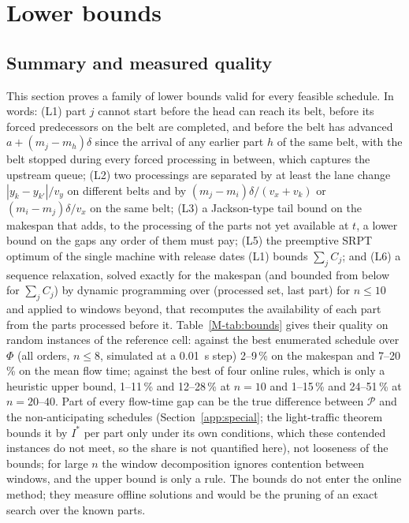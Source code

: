 \documentclass[11pt,a4paper]{article}
\theoremstyle{plain}
\theoremstyle{definition}
\theoremstyle{remark}
\newcommand{\Pb}{\mathcal{P}}
\begin{document}
\section{Lower bounds}\label{app:bounds}
\subsection{Summary and measured quality}
This section proves a family of lower bounds valid for every feasible
schedule. In words: (L1) part $j$ cannot start before the head can reach its belt, before
its forced predecessors on the belt are completed, and before the belt has advanced
$a+(m_j-m_h)\delta$ since the arrival of any earlier part $h$ of the same belt, with the
belt stopped during every forced processing in between, which captures the upstream
queue; (L2) two processings are separated by at least the lane change $|y_k-y_{k'}|/v_y$
on different belts and by $(m_j-m_i)\delta/(v_x+v_k)$ or $(m_i-m_j)\delta/v_x$ on the same
belt; (L3) a Jackson-type tail bound on the makespan that adds, to the processing of the
parts not yet available at $t$, a lower bound on the gaps any order of them must pay;
(L5) the preemptive SRPT optimum \cite{Schrage1968,Baker1974} of the single machine with
release dates (L1) bounds $\sum_jC_j$; and (L6) a sequence relaxation, solved exactly for
the makespan (and bounded from below for $\sum_jC_j$) by dynamic
programming over (processed set, last part) for $n\le10$ and applied to windows beyond,
that recomputes the availability of each part from the parts processed before it.
Table~\ref{M-tab:bounds} gives their quality on random instances of the reference cell:
against the best enumerated schedule over $\Phi$ (all orders, $n\le8$, simulated at a
0.01~s step) 2--9\,\% on the
makespan and 7--20\,\% on the mean flow time; against the best of four online rules,
which is only a heuristic upper bound, 1--11\,\% and 12--28\,\% at $n=10$ and
1--15\,\% and 24--51\,\% at $n=20$--$40$. Part of every
flow-time gap can be the true difference between $\Pb$ and the non-anticipating
schedules (Section~\ref{app:special}; the light-traffic theorem bounds it by $I^\ast$
per part only under its own conditions, which these contended instances do not meet, so
the share is not quantified here), not looseness of the bounds; for
large $n$ the window decomposition ignores contention between windows, and the upper
bound is only a rule. The bounds do not enter the online method; they measure offline
solutions and would be the pruning of an exact search over the known parts.
\end{document}
